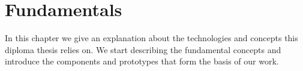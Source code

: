 \chapter{Fundamentals}
\label{chap:fundamentals}

In this chapter we give an explanation about the technologies and concepts this diploma thesis relies on. We start describing the fundamental concepts and introduce the components and prototypes that form the basis of our work.













